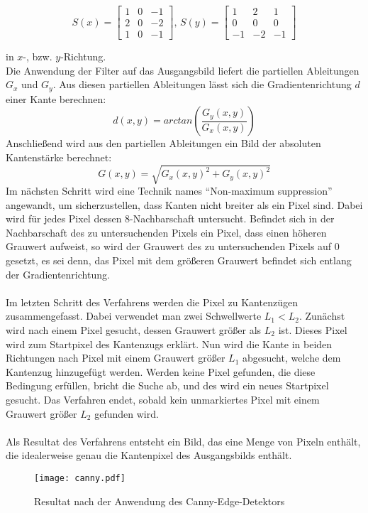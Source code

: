 \begin{equation*}
S(x) = \begin{bmatrix}
1 & 0 & -1\\ 
2 & 0 & -2\\ 
1 & 0 & -1
\end{bmatrix},\,
S(y) = \begin{bmatrix}
1 & 2 & 1\\ 
0 & 0 & 0\\ 
-1 &-2  &-1 
\end{bmatrix}
\end{equation*}

in $x$-, bzw. $y$-Richtung. \\
Die Anwendung der Filter auf das Ausgangsbild liefert die partiellen Ableitungen $G_x$ und $G_y$.
Aus diesen partiellen Ableitungen lässt sich die Gradientenrichtung $d$ einer Kante berechnen:
\begin{equation*}
d(x, y) = arctan(\frac{G_y(x, y)}{G_x(x, y)})
\end{equation*}
Anschließend wird aus den partiellen Ableitungen ein Bild der absoluten Kantenstärke berechnet:
\begin{equation*}
G(x, y) = \sqrt{G_x(x, y)^2 + G_y(x, y)^2}
\end{equation*}
Im nächsten Schritt wird eine Technik names “Non-maximum suppression” angewandt, um sicherzustellen, dass Kanten nicht breiter als ein Pixel sind. Dabei wird für jedes Pixel dessen 8-Nachbarschaft untersucht. Befindet sich in der Nachbarschaft des zu untersuchenden Pixels ein Pixel, dass einen höheren Grauwert aufweist, so wird der Grauwert des zu untersuchenden Pixels auf 0 gesetzt, es sei denn, das Pixel mit dem größeren Grauwert befindet sich entlang der Gradientenrichtung. \\ \\
Im letzten Schritt des Verfahrens werden die Pixel zu Kantenzügen zusammengefasst.
Dabei verwendet man zwei Schwellwerte $L_1 < L_2$. Zunächst wird nach einem Pixel gesucht, dessen Grauwert größer als $L_2$ ist. Dieses Pixel wird zum Startpixel des Kantenzugs erklärt. Nun wird die Kante in beiden Richtungen nach Pixel mit einem Grauwert größer $L_1$ abgesucht, welche dem Kantenzug hinzugefügt werden. Werden keine Pixel gefunden, die diese Bedingung erfüllen, bricht die Suche ab, und des wird ein neues Startpixel gesucht. Das Verfahren endet, sobald kein unmarkiertes Pixel mit einem Grauwert größer $L_2$ gefunden wird. \\ \\
Als Resultat des Verfahrens entsteht ein Bild, das eine Menge von Pixeln enthält, die idealerweise genau die Kantenpixel des Ausgangsbilds enthält.
\begin{figure}[H]
  \begin{center}
    \texttt{[image: canny.pdf]}
    \caption{Resultat nach der Anwendung des Canny-Edge-Detektors}
    \label{fig:canny}
  \end{center}
\end{figure}

